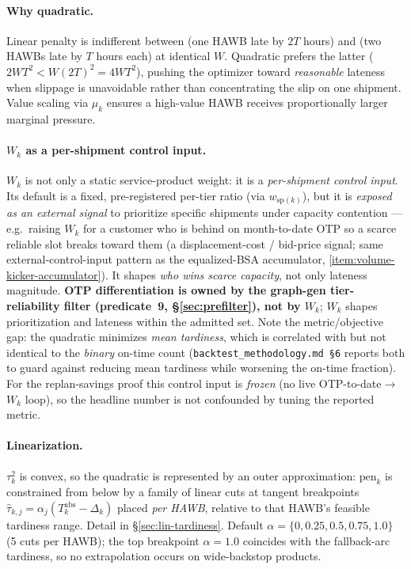 \documentclass[11pt,a4paper]{article}
\theoremstyle{definition}
\begin{document}
\paragraph{Why quadratic.}
Linear penalty is indifferent between (one HAWB late by $2T$ hours) and (two
HAWBs late by $T$ hours each) at identical $W$. Quadratic prefers the latter
($2 W T^2 < W (2T)^2 = 4 W T^2$), pushing the optimizer toward
\emph{reasonable} lateness when slippage is unavoidable rather than
concentrating the slip on one shipment. Value scaling via $\mu_k$ ensures a
high-value HAWB receives proportionally larger marginal pressure.

\paragraph{$W_k$ as a per-shipment control input.}
$W_k$ is not only a static service-product weight: it is a \emph{per-shipment
control input}. Its default is a fixed, pre-registered per-tier ratio (via
$w_{\text{sp}(k)}$), but it is \emph{exposed as an external signal} to prioritize
specific shipments under capacity contention --- e.g.\ raising $W_k$ for a customer
who is behind on month-to-date OTP so a scarce reliable slot breaks toward them (a
displacement-cost / bid-price signal; same external-control-input pattern as the
equalized-BSA accumulator, \ref{item:volume-kicker-accumulator}). It shapes
\emph{who wins scarce capacity}, not only lateness magnitude. \textbf{OTP
differentiation is owned by the graph-gen tier-reliability filter (predicate~9,
\S\ref{sec:prefilter}), not by $W_k$}; $W_k$ shapes prioritization and lateness
within the admitted set. Note the metric/objective gap: the quadratic minimizes
\emph{mean tardiness}, which is correlated with but not identical to the
\emph{binary} on-time count (\texttt{backtest\_methodology.md \S6} reports both to
guard against reducing mean tardiness while worsening the on-time fraction). For
the replan-savings proof this control input is \emph{frozen} (no live
OTP-to-date$\to$$W_k$ loop), so the headline number is not confounded by tuning the
reported metric.

\paragraph{Linearization.}
$\tau_k^2$ is convex, so the quadratic is represented by an outer
approximation: $\text{pen}_k$ is constrained from below by a family of
linear cuts at tangent breakpoints $\hat\tau_{k,j} = \alpha_j (T_k^{\text{abs}}
- \Delta_k)$ placed \emph{per HAWB}, relative to that HAWB's feasible
tardiness range. Detail in \S\ref{sec:lin-tardiness}. Default
$\alpha = \{0, 0.25, 0.5, 0.75, 1.0\}$ (5 cuts per HAWB); the top breakpoint
$\alpha = 1.0$ coincides with the fallback-arc tardiness, so no extrapolation
occurs on wide-backstop products.
\end{document}
